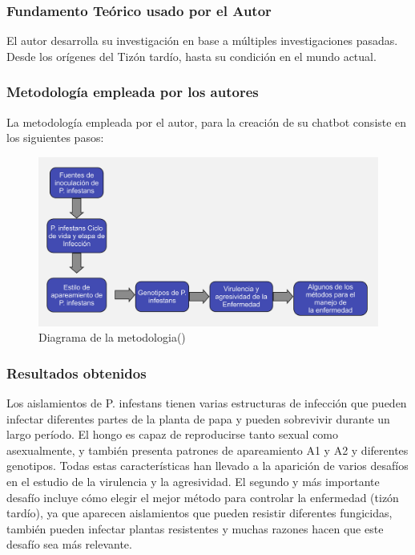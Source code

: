 \subsubsection{Fundamento Teórico usado por el Autor}

El autor desarrolla su investigación en base a múltiples investigaciones pasadas. Desde los orígenes del Tizón tardío, hasta su condición en el mundo actual.

\subsubsection{Metodología empleada por los autores}
La metodología empleada por el autor, para la creación de su chatbot consiste en los siguientes pasos: 


\begin{figure}[H]
	\begin{center}
		\includegraphics[width=1\textwidth]{2/figures/ant4.jpg}
		\caption{Diagrama de la metodologia(\cite{antecedente4})}
	\end{center}
\end{figure}

\subsubsection{Resultados obtenidos}

Los aislamientos de P. infestans tienen varias estructuras de infección que pueden infectar diferentes partes de la planta de papa y pueden sobrevivir durante un largo período. El hongo es capaz de reproducirse tanto sexual como asexualmente, y también presenta patrones de apareamiento A1 y A2 y diferentes genotipos. Todas estas características han llevado a la aparición de varios desafíos en el estudio de la virulencia y la agresividad. El segundo y más importante desafío incluye cómo elegir el mejor método para controlar la enfermedad (tizón tardío), ya que aparecen aislamientos que pueden resistir diferentes fungicidas, también pueden infectar plantas resistentes y muchas razones hacen que este desafío sea más relevante.


